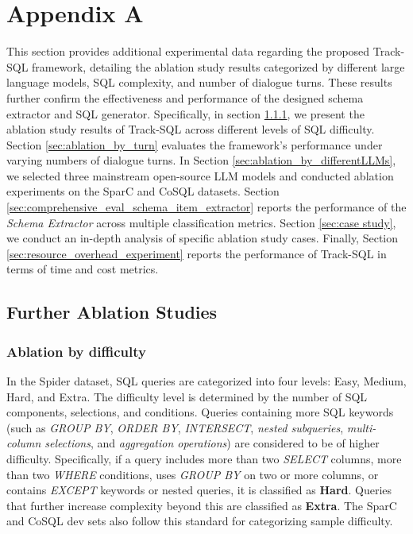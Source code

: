 \documentclass[11pt]{article}
\begin{document}

% 

\appendix

\section{Appendix A}
\label{sec:appendix a}

This section provides additional experimental data regarding the proposed Track-SQL framework, detailing the ablation study results categorized by different large language models, SQL complexity, and number of dialogue turns. These results further confirm the effectiveness and performance of the designed schema extractor and SQL generator. Specifically, in section \ref{sec:ablation_by_difficulty}, we present the ablation study results of Track-SQL across different levels of SQL difficulty. Section \ref{sec:ablation_by_turn} evaluates the framework's performance under varying numbers of dialogue turns. In Section \ref{sec:ablation_by_differentLLMs}, we selected three mainstream open-source LLM models and conducted ablation experiments on the SparC and CoSQL datasets. Section \ref{sec:comprehensive_eval_schema_item_extractor} reports the performance of the \emph{Schema Extractor} across multiple classification metrics. Section \ref{sec:case study}, we conduct an in-depth analysis of specific ablation study cases. Finally, Section \ref{sec:resource_overhead_experiment} reports the performance of Track-SQL in terms of time and cost metrics. 


\subsection{Further Ablation Studies}
\label{sec:further_ablation_studies}

\subsubsection{Ablation by difficulty}
\label{sec:ablation_by_difficulty}
In the Spider \cite{yu2018spider} dataset, SQL queries are categorized into four levels: Easy, Medium, Hard, and Extra. The difficulty level is determined by the number of SQL components, selections, and conditions. Queries containing more SQL keywords (such as \textit{GROUP BY}, \textit{ORDER BY}, \textit{INTERSECT}, \textit{nested subqueries}, \textit{multi-column selections}, and \textit{aggregation operations}) are considered to be of higher difficulty. Specifically, if a query includes more than two \textit{SELECT} columns, more than two \textit{WHERE} conditions, uses \textit{GROUP BY} on two or more columns, or contains \textit{EXCEPT} keywords or nested queries, it is classified as \textbf{Hard}. Queries that further increase complexity beyond this are classified as \textbf{Extra}. The SparC and CoSQL dev sets also follow this standard for categorizing sample difficulty.
\end{document}
